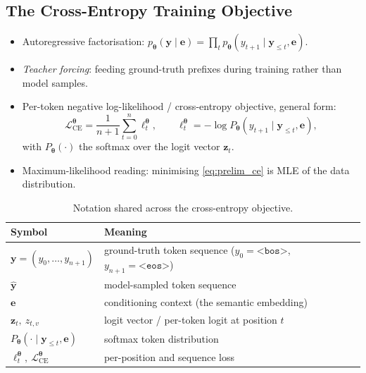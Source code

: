 \documentclass[titlepage,a4paper,11pt]{report}
\begin{document}
        \subsection{The Cross-Entropy Training Objective}\label{sec:prelim_ce}
        \begin{itemize}
            \item Autoregressive factorisation:
                  $p_{\bm\theta}(\bm y \mid \bm e) = \prod_{t} p_{\bm\theta}(y_{t+1} \mid \bm y_{\le t}, \bm e)$.
            \item \emph{Teacher forcing}: feeding ground-truth prefixes during training
                  rather than model samples. \cite{williams_learning_1989}
            \item Per-token negative log-likelihood / cross-entropy objective, general form:
            \begin{equation}\label{eq:prelim_ce}
                \mathcal{L}_{\text{CE}}^{\bm\theta} = \frac{1}{n+1}\sum_{t=0}^{n}\ell_t^{\bm\theta},
                \qquad
                \ell_t^{\bm\theta} = -\log P_{\bm\theta}(y_{t+1}\mid \bm y_{\le t},\bm e),
            \end{equation}
            with $P_{\bm\theta}(\cdot)$ the softmax over the logit vector $\bm z_t$.
            \item Maximum-likelihood reading: minimising \eqref{eq:prelim_ce} is MLE of the
                  data distribution. %
        \end{itemize}
    
        \begin{table}[ht]
            \centering
            \caption{Notation shared across the cross-entropy objective.}
            \label{tab:prelim_notation}
            \begin{tabular}{ll}
                \toprule
                Symbol & Meaning \\
                \midrule
                $\bm y = (y_0,\dots,y_{n+1})$ & ground-truth token sequence ($y_0=\texttt{<bos>}$, $y_{n+1}=\texttt{<eos>}$) \\
                $\hat{\bm y}$                 & model-sampled token sequence \\
                $\bm e$                       & conditioning context (the semantic embedding) \\
                $\bm z_t,\ z_{t,v}$           & logit vector / per-token logit at position $t$ \\
                $P_{\bm\theta}(\cdot\mid\bm y_{\le t},\bm e)$ & softmax token distribution \\
                $\ell_t^{\bm\theta},\ \mathcal{L}_{\text{CE}}^{\bm\theta}$ & per-position and sequence loss \\
                \bottomrule
            \end{tabular}
        \end{table}
    
\end{document}
